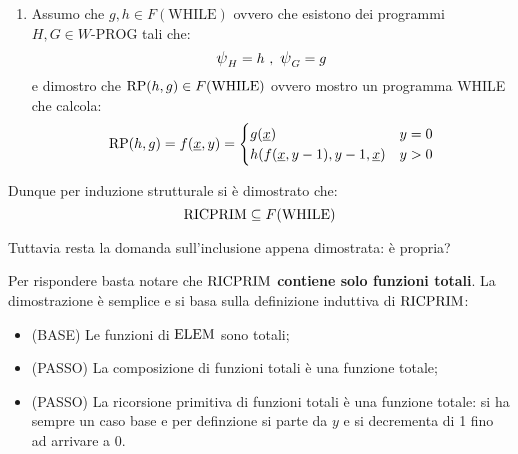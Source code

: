\begin{enumerate}
\begin{minipage}{.9\textwidth}
\begin{algorithm}[H]
        \end{algorithm}
    \end{minipage}
    \item Assumo che $g,h\in F(\text{WHILE})$ ovvero che esistono dei programmi
    $H,G\in W\text{-PROG}$ tali che:
    $$ \semWHILE_H=h \ ,\ \semWHILE_{G}=g $$ 
    e dimostro che 
    $\text{RP}(h,g)\in F(\text{WHILE})$ ovvero mostro un programma WHILE che calcola:
    $$ \text{RP}(h,g) = f(\text{\underline{$x$}},y) = \begin{cases}
    g(\text{\underline{$x$}}) & y=0\\
    h(f(\text{\underline{$x$}},y-1),y-1,\text{\underline{$x$}}) & y>0
    \end{cases}$$
    \begin{center}
    \begin{minipage}{.85\textwidth}
    \begin{tcolorbox}[colback=white,sharp corners,boxrule=.2mm]
    \end{tcolorbox}
    \end{minipage}
    \end{center}\vspace{1em}
\end{enumerate}

Dunque per induzione strutturale si è dimostrato che:
$$ \text{RICPRIM} \subseteq F(\text{WHILE}) $$

Tuttavia resta la domanda sull'inclusione appena dimostrata: è propria?

Per rispondere basta notare che \textbf{$\text{RICPRIM}$ contiene solo funzioni totali}. La 
dimostrazione è semplice e si basa sulla definizione induttiva di $\text{RICPRIM}$:
\begin{itemize}
    \item (BASE) Le funzioni di $\text{ELEM}$ sono totali;
    \item (PASSO) La composizione di funzioni totali è una funzione totale;
    \item (PASSO) La ricorsione primitiva di funzioni totali è una funzione totale: si ha sempre
        un caso base e per definzione si parte da $y$ e si decrementa di 1 fino ad arrivare a 0.
\end{itemize}

